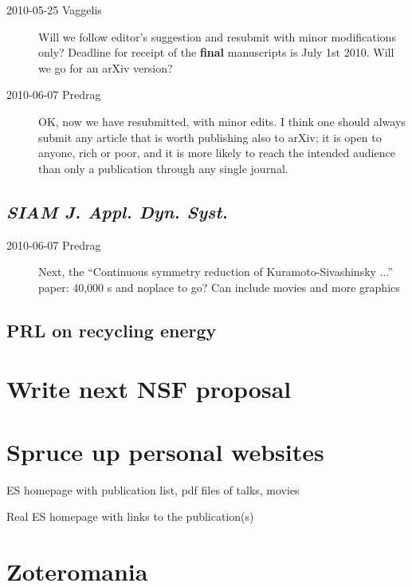 \begin{description}

\item[2010-05-25 Vaggelis]
Will we follow editor's suggestion and resubmit with minor modifications only?
Deadline for receipt of the {\bf final} manuscripts is July 1st 2010.
Will we go for an arXiv version?

\item[2010-06-07 Predrag]
OK, now we have resubmitted, with minor edits. I think one should always submit
any article that is worth publishing also to arXiv;
it is open to anyone, rich or poor, and it is
more likely to reach the intended audience than only a publication through
any single journal.

\end{description}

\subsection{\emph{SIAM J. Appl. Dyn. Syst.}}

\begin{description} 

\item[2010-06-07 Predrag] Next, the
``Continuous symmetry reduction of Kuramoto-Sivashinsky ...'' paper:
40,000 \rpo s and noplace to go?
Can include movies and more graphics

\end{description}

\subsection{PRL on recycling energy}

\section{Write next NSF proposal }

\section{Spruce up personal websites}

ES homepage with publication list, pdf files of talks, movies

Real ES homepage with links to the publication(s)

\section{Zoteromania}

